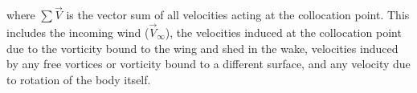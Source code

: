 \noindent where $\sum \vec{V}$ is the vector sum of all velocities acting at the collocation point. This includes the incoming wind ($\vec{V}_\infty$), the velocities induced at the collocation point due to the vorticity bound to the wing and shed in the wake, velocities induced by any free vortices or vorticity bound to a different surface, and any velocity due to rotation of the body itself.
%





